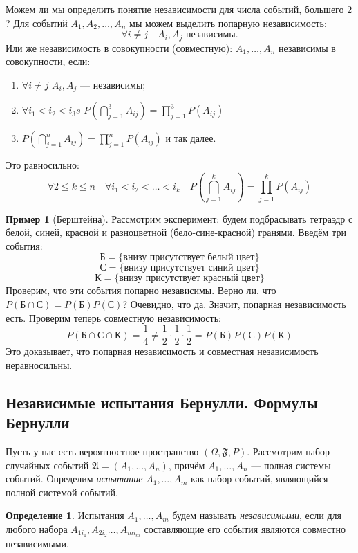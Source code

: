 \documentclass[11pt,openany,a4paper]{scrartcl}
\theoremstyle{plain}
\theoremstyle{definition}
\newtheorem{definition}[theorem]{Определение}
\newtheorem{example}[theorem]{Пример}
\begin{document}
Можем ли мы определить понятие независимости для числа событий, большего $2$?
Для событий $A_1, A_2, \ldots, A_n$ мы можем выделить попарную независимость:
$$
\forall i\neq j\quad A_i, A_j \text{ независимы.}
$$
Или же независимость в совокупности (совместную): $A_1, \ldots, A_n$ независимы в
совокупности, если:
\begin{enumerate}
    \item $\forall i\neq j$ $A_i, A_j$ — независимы;
    \item $\forall i_1<i_2<i_3s$ $P(\bigcap_{j=1}^3 A_{ij}) = \prod_{j=1}^3P(A_{ij})$
    \item $P(\bigcap_{j=1}^n A_{ij}) = \prod_{j=1}^n P(A_{ij})$ и так далее.
\end{enumerate}
Это равносильно:
$$
\forall 2 \leqslant k \leqslant n \quad \forall i_1 < i_2 < \ldots < i_k\quad
P(\bigcap_{j=1}^k A_{ij}) = \prod_{j=1}^k P(A_{ij})
$$

\begin{example}[Берштейна]
    Рассмотрим эксперимент: будем подбрасывать тетраэдр с белой, синей, красной и 
    разноцветной (бело-сине-красной) гранями. Введём три события:
    $$Б = \{\text{внизу присутствует белый цвет}\}$$
    $$С = \{\text{внизу присутствует синий цвет}\}$$
    $$К = \{\text{внизу присутствует красный цвет}\}$$
    Проверим, что эти события попарно независимы. Верно ли, что
    $P(Б \cap С) = P(Б)P(С)$? Очевидно, что да. Значит, попарная независимость есть.
    Проверим теперь совместную независимость:
    $$
    P(Б\cap С\cap К) = \frac{1}{4} \neq \frac{1}{2} \cdot\frac{1}{2} \cdot\frac{1}{2} =
    P(Б)P(С)P(К)
    $$
    Это доказывает, что попарная независимость и совместная независимость 
    неравносильны.
\end{example}

\subsection{Независимые испытания Бернулли. Формулы Бернулли}

Пусть у нас есть вероятностное пространство $(\Omega, \mathfrak{F}, P)$.
Рассмотрим набор случайных событий $\mathfrak A = (A_1, \ldots, A_n)$,
причём $A_1, \ldots, A_n$ — полная системы событий. Определим \emph{испытание}
$A_1, \ldots, A_m$ как 
набор событий, являющийся полной системой событий.

\begin{definition}
    Испытания $A_1, \ldots, A_m$ будем называть \emph{независимыми}, если для любого
    набора $A_{1i_1}, A_{2i_2} \ldots, A_{mi_m}$ составляющие его события являются
    совместно независимыми.
\end{definition}
\end{document}
